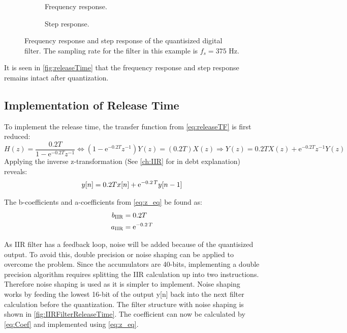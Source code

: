 \begin{figure}[H]
\centering
\begin{subfigure}[t]{0.45\textwidth}
	
	\caption{Frequency response.}
	\label{fig:releaseTimeDigitalFreq}
\end{subfigure}
\hfill
\begin{subfigure}[t]{0.45\textwidth}
	
	\caption{Step response.}
	\label{fig:releaseTimeDigitalStep}
\end{subfigure}
\caption{Frequency response and step response of the quantisized digital filter. The sampling rate for the filter in this example is $f_s = 375$ Hz.}
\label{fig:releaseTime}
\end{figure}

It is seen in \autoref{fig:releaseTime} that the frequency response and step response remains intact after quantization.

\subsection*{Implementation of Release Time}

To implement the release time, the transfer function from \autoref{eq:releaseTF} is first reduced:
\begin{equation}
H(z) = \frac{0.2T}{1-\text{e}^{-0.2T} z^{-1}}  \Leftrightarrow (1-\text{e}^{-0.2T} z^{-1})Y(z) = (0.2T)X(z) \Rightarrow Y(z) = 0.2TX(z) + \text{e}^{-0.2T} z^{-1}Y(z)
\end{equation}
Applying the inverse z-transformation (See \autoref{ch:IIR} for in debt explanation) reveals:
\begin{align}
y[n] = 0.2Tx[n] + {\rm e}^{- 0.2\,T}y[n-1]
\label{eq:z_eq}
\end{align}

The b-coefficients and a-coefficients from \autoref{eq:z_eq} be found as:
\begin{align}
b_{\text{IIR}} &= 0.2T \\
a_{\text{IIR}} &= {\rm e}^{- 0.2\,T}
\label{eq:Coef}
\end{align}

As IIR filter has a feedback loop, noise will be added because of the quantisized output. To avoid this, double precision or noise shaping can be applied to overcome the problem. Since the accumulators are 40-bits, implementing a double precision algorithm requires splitting the IIR calculation up into two instructions. Therefore noise shaping is used as it is simpler to implement. Noise shaping works by feeding the lowest 16-bit of the output y[n] back into the next filter calculation before the quantization. The filter structure with noise shaping is shown in \autoref{fig:IIRFilterReleaseTime}. The coefficient can now be calculated by \autoref{eq:Coef} and implemented using \autoref{eq:z_eq}.

